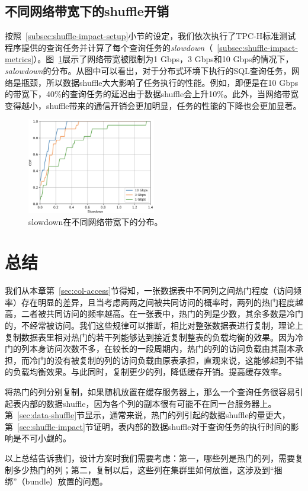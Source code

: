 \subsection{不同网络带宽下的shuffle开销}

\par 按照~\ref{subsec:shuffle-impact-setup}小节的设定，我们依次执行了TPC-H标准测试程序提供的查询任务并计算了每个查询任务的\emph{slowdown}（~\ref{subsec:shuffle-impact-metrics}）。图~\ref{fig:cdf16-all}展示了网络带宽被限制为1 Gbps，3 Gbps和10 Gbps的情况下，\emph{salowdown}的分布。从图中可以看出，对于分布式环境下执行的SQL查询任务，网络是瓶颈，所以数据shuffle大大影响了任务执行的性能。例如，即便是在10 Gbps的带宽下，40\%的查询任务的延迟由于数据shuffle会上升10\%。此外，当网络带宽变得越小，shuffle带来的通信开销会更加明显，任务的性能的下降也会更加显著。



\begin{figure}[]
	\centering
	\includegraphics[width=0.5\textwidth]{img/motivation/cdf16-all}
	
	\caption{slowdown在不同网络带宽下的分布。}
	\label{fig:cdf16-all}
\end{figure}

\section{总结}

\par 我们从本章第~\ref{sec:col-access}节得知，一张数据表中不同列之间热门程度（访问频率）存在明显的差异，且当考虑两两之间被共同访问的概率时，两列的热门程度越高，二者被共同访问的频率越高。在一张表中，热门的列是少数，其余多数是冷门的，不经常被访问。我们这些规律可以推断，相比对整张数据表进行复制，理论上复制数据表里相对热门的若干列能够达到接近复制整表的负载均衡的效果。因为冷门的列本身访问次数不多，在较长的一段周期内，热门的列的访问负载由其副本承担，而冷门的没有被复制的列的访问负载由原表承担，直观来说，这能够起到不错的负载均衡效果。与此同时，复制更少的列，降低缓存开销。提高缓存效率。

\par 将热门的列分别复制，如果随机放置在缓存服务器上，那么一个查询任务很容易引起表内部的数据shuffle，因为各个列的副本很有可能不在同一台服务器上。第~\ref{sec:data-shuffle}节显示，通常来说，热门的列引起的数据shuffle的量更大，第~\ref{sec:shuffle-impact}节证明，表内部的数据shuffle对于查询任务的执行时间的影响是不可小觑的。

\par 以上总结告诉我们，设计方案时我们需要考虑：第一，哪些列是热门的列，需要复制多少热门的列；第二，复制以后，这些列在集群里如何放置，这涉及到“捆绑”（bundle）放置的问题。